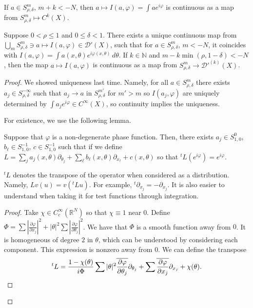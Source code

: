 \documentclass[12pt]{scrartcl}
\newcommand{\N}{\mathbb{N}}
\newcommand{\R}{\mathbb{R}}
\newcommand{\<}{\langle}
\renewcommand{\>}{\rangle}
\let \phi \varphi
\let \mc \mathcal
\begin{document}
\begin{lemma} If $a \in S_{\rho, \delta}^m$, $m+k < -N$, then $a \mapsto I(a, \phi) = \int ae^{i\phi}$ is continuous as a map from $S_{\rho, \delta}^m \mapsto C^k(X)$.  
\end{lemma}
\begin{theorem} Suppose $0 < \rho \le 1$ and $0 \le \delta < 1$.  There exists a unique continuous map from $\bigcup_m S^{m}_{\rho, \delta} \ni a \mapsto I(a, \phi) \in \mc D'(X)$, such that for $a \in S^{m}_{\rho, \delta}$, $m < -N$, it coincides with $I(a, \phi) = \int a(x, \theta) e^{i \phi(x, \theta)}\, d\theta$.  If $k \in \N$ and $m - k \min(\rho, 1-\delta) < -N$, then the map $a \mapsto I(a, \phi)$ is continuous as a map from $S^m_{\rho, \delta} \to \mc D'^{(k)}(X)$.  
\end{theorem}
\begin{proof}
We showed uniqueness last time.  Namely, for all $a \in S_{\rho, \delta}^m$ there exists $a_j \in S_{\rho, \delta}^{-\infty}$ such that $a_j \to a$ in $S_{\rho ,\delta}^{m'}$ for $m' > m$ so $I(a_j, \phi)$ are uniquely determined by $\int a_j e^{i\phi} \in C^\infty(X)$, so continuity implies the uniqueness.

For existence, we use the following lemma.
\begin{lemma} Suppose that $\phi$ is a non-degenerate phase function.  Then, there exists $a_j \in S_{1, 0}^0$, $b_\ell \in S_{1, 0}^{-1}$, $c \in S_{1, 0}^{-1}$ such that if we define $L = \sum_j a_j(x, \theta) \partial_{\theta_j} + \sum_\ell b_\ell(x, \theta)\partial_{x_\ell} + c(x, \theta)$ so that ${}^tL(e^{i\phi}) = e^{i\phi}$.
\end{lemma}
\begin{example} ${}^tL$ denotes the transpose of the operator when considered as a distribution.  Namely, $Lv(u) = v({}^t L u)$.  For example, ${}^t \partial_{x_j} = -\partial_{x_j}$.  It is also easier to understand when taking it for test functions through integration.
\end{example}
\begin{proof}
Take $\chi \in C_c^\infty(\R^N)$ so that $\chi \equiv 1$ near $0$.  Define $\Phi = \sum |\frac{\partial \phi}{\partial x_j}|^2 + |\theta|^2 \sum |\frac{\partial \phi}{\partial \theta_j}|^2$.  We have that $\Phi$ is a smooth function away from $0$.  It is homogeneous of degree $2$ in $\theta$, which can be understood by considering each component.  This expression is nonzero away from $0$.  We can define the transpose 
$${}^t L = \frac{1 - \chi(\theta)}{i\Phi} \sum |\theta|^2 \ol{\frac{\partial \phi}{\partial \theta_j}} \partial_{\theta_j} + \sum \ol{\frac{\partial \phi}{\partial x_j}} \partial_{x_j}  + \chi(\theta).$$


\end{proof}
\end{proof}
\end{document}

